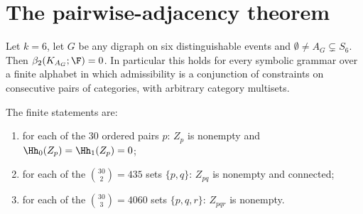 \section{The pairwise-adjacency theorem}
\begin{theorem}\label{thm:pairwise}
Let $k=6$, let $G$ be any digraph on six distinguishable events and $\emptyset\neq A_G\subsetneq S_6$. Then $\beta_2(K_{A_G};\F)=0$. In particular this holds for every symbolic grammar over a finite alphabet in which admissibility is a conjunction of constraints on consecutive pairs of categories, with arbitrary category multisets.
\end{theorem}
The finite statements are:
\begin{enumerate}[label=(F\arabic*)]
\item for each of the $30$ ordered pairs $p$: $Z_p$ is nonempty and $\Hh_0(Z_p)=\Hh_1(Z_p)=0$;
\item for each of the $\binom{30}{2}=435$ sets $\{p,q\}$: $Z_{pq}$ is nonempty and connected;
\item for each of the $\binom{30}{3}=4060$ sets $\{p,q,r\}$: $Z_{pqr}$ is nonempty.
\end{enumerate}
